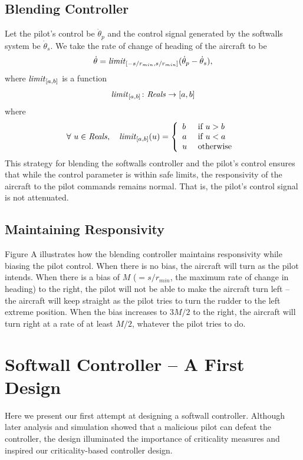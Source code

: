 \documentclass[11pt]{article}
\begin{document}
\subsection{Blending Controller}

Let the pilot's control be $\dot{\theta}_p$ and the control signal
generated by the softwalls system be $\dot{\theta}_s$.
We take the rate of change of heading of the aircraft to
be
\[
\dot{\theta} = \mbox{\textit{limit}}_{[-s/r_{min}, s/r_{min}]}
(\dot{\theta}_p - \dot{\theta}_s ),
\]
where $\mbox{\textit{limit}}_{[a,b]}$ is a function
\[
\mbox{\textit{limit}}_{[a,b]} \colon \mbox{\textit{Reals}} \to [a, b]
\]
where
\[
\forall ~ u \in \mbox{\textit{Reals}}, \quad
\mbox{\textit{limit}}_{[a,b]}(u) = \left \{
\begin{array}{ll}
b&\mbox{ if } u > b\\
a&\mbox{ if } u < a\\
u&\mbox{ otherwise }
\end{array}
\right .
\]
This strategy for blending the softwalls controller and the
pilot's control ensures that while the control parameter is within
safe limits, the responsivity of the aircraft to the pilot
commands remains normal.
That is, the pilot's control signal is not attenuated.

\subsection{Maintaining Responsivity}

Figure A illustrates how the blending controller maintains responsivity while
biasing the pilot control. When there is no bias, the aircraft will turn as the
pilot intends. When there is a bias of $M$ ($= s/r_{min}$, the maximum rate of
change in heading) to the right, the pilot will not be able to make the
aircraft turn left -- the aircraft will keep straight as the pilot tries to
turn the rudder to the left extreme position.
When the bias increases to $3M/2$ to the right, the aircraft will turn right at
a rate of at least $M/2$, whatever the pilot tries to do.

\section{Softwall Controller -- A First Design}

Here we present our first attempt at designing a softwall controller.
Although later analysis and simulation showed that a malicious pilot can defeat
the controller, the design illuminated the importance of criticality measures
and inspired our criticality-based controller design.
\end{document}
